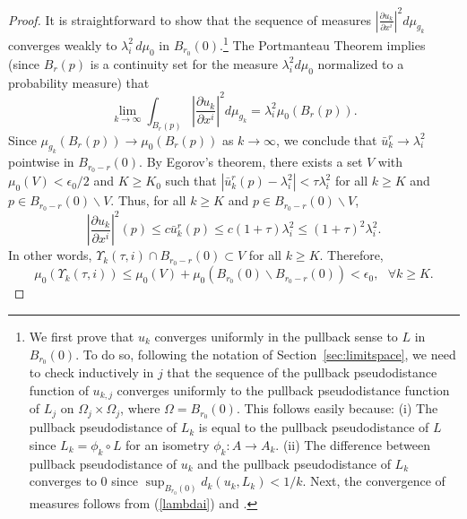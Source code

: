 \documentclass[12pt]{amsart}
\theoremstyle{definition}
\numberwithin{equation}{section}
\begin{document}
\begin{proof}
It is straightforward to show that the sequence of measures $\left|\frac{\partial u_k}{\partial x^i} \right|^2 d\mu_{g_k}$ converges weakly to  $\lambda_i^2 \, d\mu_0$ in $B_{r_0}(0)$.\footnote{We first prove that $u_k$ converges uniformly in the pullback sense to $L$ in $B_{r_0}(0)$. To do so, following the notation of Section~\ref{sec:limitspace}, we  need to  check inductively in $j$ that the sequence of the pullback pseudodistance function of $u_{k,j}$ converges uniformly to the pullback pseudodistance function of   $L_j$ on $\Omega_j \times \Omega_j$, where $\Omega=B_{r_0}(0)$.  This follows easily because: (i) The pullback pseudodistance of  $L_k$  is equal to the pullback pseudodistance of $L$ since $L_k=\phi_k \circ L$ for an isometry $\phi_k:A\to A_k$. (ii) The difference between pullback pseudodistance of $u_k$ and  the pullback pseudodistance of  $L_k$ converges to 0 since $\sup_{B_{r_0}(0)}d_k(u_k, L_k) < 1/k$. 
Next, the convergence of measures follows from (\ref{lambdai}) and  \cite[Theorem 3.11]{korevaar-schoen2}.}
The Portmanteau Theorem implies (since $B_r(p)$ is a continuity set for the measure $\lambda_i^2d\mu_0$ normalized to a probability measure) that
\[
\lim_{k \rightarrow \infty} \int_{B_r(p)}   \left|\frac{\partial u_k}{\partial x^i} \right|^2 d\mu_{g_k}
=
\lambda_i^2 \mu_0(B_r(p)).
\]
Since $\mu_{g_k}(B_r(p)) \rightarrow \mu_0(B_r(p))$ as $k \rightarrow \infty$, we conclude that $\bar u^r_k \rightarrow \lambda_i^2$ pointwise in  $B_{r_0-r}(0)$. By Egorov's theorem, there exists a set $V$ with  $\mu_0(V)< \epsilon_0/2$ and $K \geq K_0$ such that $|\bar u^r_k(p) -\lambda_i^2|<\tau \lambda_i^2$ for all $k \geq K$ and $p \in B_{r_0-r}(0) \backslash V$.   Thus, for all
 $k\geq K$ and  $p \in B_{r_0-r}(0) \backslash V$,  
 \[
\left|\frac{\partial u_k}{\partial x^i} \right|^2(p)  \leq c \bar u^r_k(p) \leq c\left(1+\tau \right) \lambda_i^2 \leq (1+\tau)^2 \lambda_i^2.
\]
In other words,  $\Upsilon_k(\tau, i) \cap B_{r_0-r}(0) \subset V$ for all $k\geq K$.  Therefore,
\[
\mu_0(\Upsilon_k(\tau, i)) \leq \mu_0(V) +\mu_0(B_{r_0}(0)\backslash B_{r_0-r}(0))<\epsilon_0, \ \ \ \forall k \geq K.
\]
\end{proof}
\end{document}

